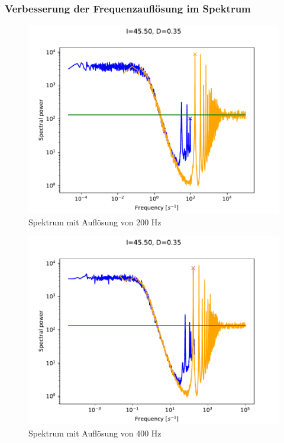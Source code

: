 \documentclass[12pt,a4paper]{article}
\begin{document}
\subsubsection{Verbesserung der Frequenzauflösung im Spektrum}
\begin{figure}[H]
	\centering
	\includegraphics[scale=1]{freq200.pdf}\caption{Spektrum mit Auflösung von 200 Hz}
	\label{freq200}
\end{figure}
\begin{figure}[H]
	\centering
	\includegraphics[scale=1]{freq400.pdf}\caption{Spektrum mit Auflösung von 400 Hz}
	\label{freq400}
\end{figure}
\end{document}
